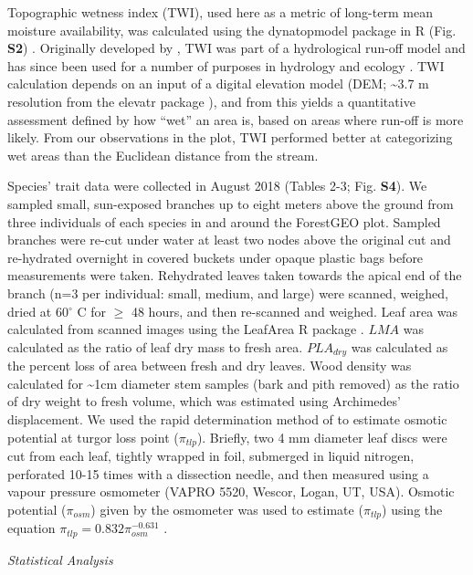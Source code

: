 \documentclass[
]{article}
\begin{document}
Topographic wetness index (TWI), used here as a metric of long-term mean
moisture availability, was calculated using the dynatopmodel package in
R (Fig. \textbf{S2}) \citep{R-dynatopmodel}. Originally developed by
\citet{beven_physically_1979}, TWI was part of a hydrological run-off
model and has since been used for a number of purposes in hydrology and
ecology \citep{sorensen_calculation_2006}. TWI calculation depends on an
input of a digital elevation model (DEM; \textasciitilde3.7 m resolution
from the elevatr package \citep{R-elevatr}), and from this yields a
quantitative assessment defined by how ``wet'' an area is, based on
areas where run-off is more likely. From our observations in the plot,
TWI performed better at categorizing wet areas than the Euclidean
distance from the stream.

Species' trait data were collected in August 2018 (Tables 2-3; Fig.
\textbf{S4}). We sampled small, sun-exposed branches up to eight meters
above the ground from three individuals of each species in and around
the ForestGEO plot. Sampled branches were re-cut under water at least
two nodes above the original cut and re-hydrated overnight in covered
buckets under opaque plastic bags before measurements were taken.
Rehydrated leaves taken towards the apical end of the branch (n=3 per
individual: small, medium, and large) were scanned, weighed, dried at
60\(^\circ\) C for \(\ge\) 48 hours, and then re-scanned and weighed.
Leaf area was calculated from scanned images using the LeafArea R
package \citep{R-LeafArea}. \(LMA\) was calculated as the ratio of leaf
dry mass to fresh area. \(PLA_{dry}\) was calculated as the percent loss
of area between fresh and dry leaves. Wood density was calculated for
\textasciitilde1cm diameter stem samples (bark and pith removed) as the
ratio of dry weight to fresh volume, which was estimated using
Archimedes' displacement. We used the rapid determination method of
\citet{bartlett_rapid_2012} to estimate osmotic potential at turgor loss
point (\(\pi_{tlp}\)). Briefly, two 4 mm diameter leaf discs were cut
from each leaf, tightly wrapped in foil, submerged in liquid nitrogen,
perforated 10-15 times with a dissection needle, and then measured using
a vapour pressure osmometer (VAPRO 5520, Wescor, Logan, UT, USA).
Osmotic potential (\(\pi_{osm}\)) given by the osmometer was used to
estimate (\(\pi_{tlp}\)) using the equation
\(\pi_{tlp}=0.832 \pi_{osm} ^{-0.631}\) \citep{bartlett_rapid_2012}.

\emph{Statistical Analysis}
\end{document}
